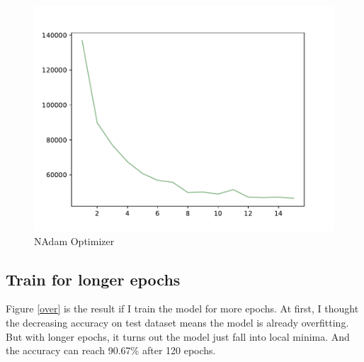\documentclass{article}
\begin{document}
\begin{figure}[!h]
{\begin{minipage}{0.21\linewidth}
  \includegraphics[scale=0.23]{imgs/test_loss_nadam.pdf}
  \end{minipage}
}
\quad
{}
\caption{ NAdam Optimizer}
\label{nadam}
\end{figure}

\subsection{Train for longer epochs}
Figure \ref{over} is the result if I train the model for more epochs. At first, I thought the decreasing accuracy on test dataset means the model is already overfitting. But with longer epochs, it turns out the model just fall into local minima. And the accuracy can reach 90.67\% after 120 epochs.
\end{document}
